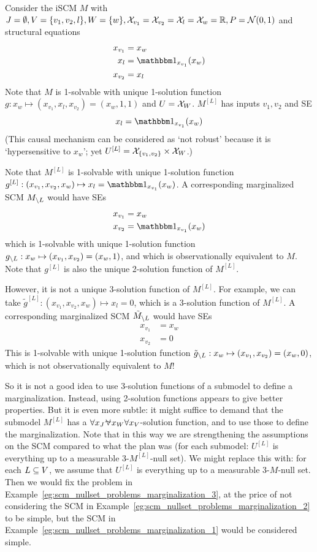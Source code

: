 \begin{Eg}\label{eg:scm_nullset_problems_marginalization_3}
  Consider the iSCM $M$ with $J=\emptyset,V=\{v_1,v_2,l\},W=\{w\},\mathcal{X}_{v_1}=\mathcal{X}_{v_2}=\mathcal{X}_l=\mathcal{X}_w=\mathbb{R},P=\mathcal{N}(0,1)$ and structural equations
  \begin{align*}
    x_{v_1} & = x_w \\
    x_l & = \ind_{x_{v_1}}(x_w) \\
    x_{v_2} & = x_l
  \end{align*}
  Note that $M$ is 1-solvable with unique 1-solution function $g : x_w \mapsto (x_{v_1},x_l,x_{v_2})=(x_w,1,1)$ and $U = \mathcal{X}_W$.
  $M^{[L]}$ has inputs $v_1,v_2$ and SE
  $$x_l = \ind_{x_{v_1}}(x_w)$$
  (This causal mechanism can be considered as `not robust' because it is `hypersensitive to $x_w$'; yet $U^{[L]} = \mathcal{X}_{\{v_1,v_2\}} \times \mathcal{X}_W$.)

  Note that $M^{[L]}$ is 1-solvable with unique 1-solution function $g^{[L]} : (x_{v_1},x_{v_2},x_w) \mapsto x_l = \ind_{x_{v_1}}(x_w)$.
  A corresponding marginalized SCM $M_{\setminus L}$ would have SEs
  \begin{align*}
    x_{v_1} & = x_w \\
    x_{v_2} & = \ind_{x_{v_1}}(x_w)
  \end{align*}
  which is 1-solvable with unique 1-solution function $g_{\setminus L} : x_w \mapsto (x_{v_1},x_{v_2})=(x_w,1)$, and which is observationally equivalent to $M$.
  Note that $g^{[L]}$ is also the unique 2-solution function of $M^{[L]}$.

  However, it is not a unique 3-solution function of $M^{[L]}$. 
  For example, we can take $\tilde g^{[L]} : (x_{v_1},x_{v_2},x_w) \mapsto x_l = 0$, which is a 3-solution function of $M^{[L]}$.
  A corresponding marginalized SCM $\tilde{M}_{\setminus L}$ would have SEs
  \begin{align*}
    x_{v_1} & = x_w \\
    x_{v_2} & = 0
  \end{align*}
  This is 1-solvable with unique 1-solution function $\tilde{g}_{\setminus L} : x_w \mapsto (x_{v_1},x_{v_2})=(x_w,0)$, which is not observationally equivalent to $M$!
\end{Eg}
So it is not a good idea to use 3-solution functions of a submodel to define a marginalization.
Instead, using 2-solution functions appears to give better properties.
But it is even more subtle: it might suffice to demand that the submodel $M^{[L]}$ has a $\forall x_J \foralmostall x_W \forall x_V$-solution function,
and to use those to define the marginalization. 
Note that in this way we are strengthening the assumptions on the SCM compared to what the plan was (for each submodel: $U^{[L]}$ is everything up to a measurable 3-$M^{[L]}$-null set).
We might replace this with: for each $L \subseteq V$, we assume that $U^{[L]}$ is everything up to a measurable 3-$M$-null set.
Then we would fix the problem in Example~\ref{eg:scm_nullset_problems_marginalization_3}, at the price of not considering the SCM in Example~\ref{eg:scm_nullset_problems_marginalization_2} to be simple,
but the SCM in Example~\ref{eg:scm_nullset_problems_marginalization_1} would be considered simple.

